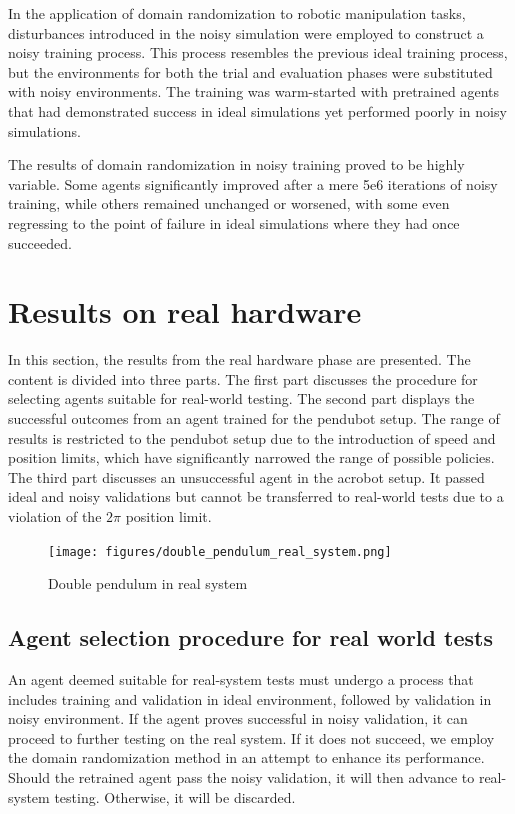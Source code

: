 In the application of domain randomization to robotic manipulation tasks, disturbances introduced in the noisy simulation were employed to construct a noisy training process. This process resembles the previous ideal training process, but the environments for both the trial and evaluation phases were substituted with noisy environments. The training was warm-started with pretrained agents that had demonstrated success in ideal simulations yet performed poorly in noisy simulations.

The results of domain randomization in noisy training proved to be highly variable. Some agents significantly improved after a mere 5e6 iterations of noisy training, while others remained unchanged or worsened, with some even regressing to the point of failure in ideal simulations where they had once succeeded.


\section{Results on real hardware}
In this section, the results from the real hardware phase are presented. The content is divided into three parts. The first part discusses the procedure for selecting agents suitable for real-world testing. The second part displays the successful outcomes from an agent trained for the pendubot setup. The range of results is restricted to the pendubot setup due to the introduction of speed and position limits, which have significantly narrowed the range of possible policies. The third part discusses an unsuccessful agent in the acrobot setup. It passed ideal and noisy validations but cannot be transferred to real-world tests due to a violation of the \(2\pi\) position limit.

\begin{figure}[H]
    \centering
    \texttt{[image: figures/double\_pendulum\_real\_system.png]}
    \caption{Double pendulum in real system}
    \label{fig:double_pendulum_real_system}
\end{figure}

\subsection{Agent selection procedure for real world tests}
An agent deemed suitable for real-system tests must undergo a process that includes training and validation in ideal environment, followed by validation in noisy environment. If the agent proves successful in noisy validation, it can proceed to further testing on the real system. If it does not succeed, we employ the domain randomization method in an attempt to enhance its performance. Should the retrained agent pass the noisy validation, it will then advance to real-system testing. Otherwise, it will be discarded.

